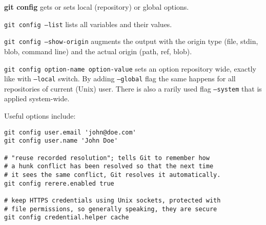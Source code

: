 %

\textbf{git config} gets or sets local (repository) or global options.

\texttt{git config --list} lists all variables and their values.

\texttt{git config --show-origin} augments the output with the origin type (file, stdin, blob, command line) and the actual origin (path, ref, blob).

\texttt{git config option-name option-value} sets an option repository wide, exactly like with \texttt{--local} switch.
By adding \texttt{--global} flag the same happens for all repositories of current (Unix) user.
There is also a rarily used flag \texttt{--system} that is applied system-wide.

Useful options include:
\begin{verbatim}
git config user.email 'john@doe.com'
git config user.name 'John Doe'

# "reuse recorded resolution"; tells Git to remember how
# a hunk conflict has been resolved so that the next time
# it sees the same conflict, Git resolves it automatically.
git config rerere.enabled true

# keep HTTPS credentials using Unix sockets, protected with
# file permissions, so generally speaking, they are secure
git config credential.helper cache
\end{verbatim}

%